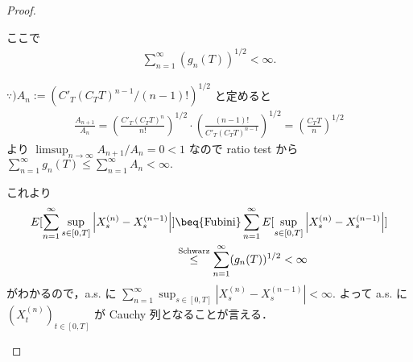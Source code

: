 \documentclass{jsarticle}
\begin{document}
\begin{proof}
\begin{enumerate}[label=(\roman*)]



        ここで
        \begin{align}
            \sum_{n=1}^{\infty}(g_n(T))^{1/2}<\infty.
        \end{align}

        \begin{screen}
            $\because) A_n:=(C'_T(C_T T)^{n-1}/(n-1)!)^{1/2}$ と定めると
            \begin{align}
                \frac{A_{n+1}}{A_n}
                = \left(\frac{C'_T(C_T T)^{n}}{n!}\right)^{1/2}\cdot \left(\frac{(n-1)!}{C'_T(C_T T)^{n-1}}\right)^{1/2}
                = \left(\frac{C_T T}{n}\right)^{1/2}
            \end{align}
            より $\limsup_{n\to\infty}A_{n+1}/A_n=0<1$ なので ratio test から $\sum_{n=1}^{\infty}g_n(T)\le\sum_{n=1}^{\infty}A_n<\infty.$
        \end{screen}

        これより
        \begin{align}
            E[\sum_{n=1}^{\infty}\sup_{s\in[0, T]}\left\lvert X_s^{(n)}-X_s^{(n-1)}\right\rvert]
            &\beq{\text{Fubini}} \sum_{n=1}^{\infty}E[\sup_{s\in[0, T]}\left\lvert X_s^{(n)}-X_s^{(n-1)}\right\rvert] \\
            &\stackrel{\text{Schwarz}}{\le} \sum_{n=1}^{\infty}(g_n(T))^{1/2} < \infty
        \end{align}
        がわかるので，a.s. に $\sum_{n=1}^{\infty}\sup_{s\in[0, T]}\left\lvert X_s^{(n)}-X_s^{(n-1)}\right\rvert<\infty.$
        よって a.s. に $(X_t^{(n)})_{t\in[0, T]}$ が Cauchy 列となることが言える．


\end{enumerate}
\end{proof}
\end{document}
